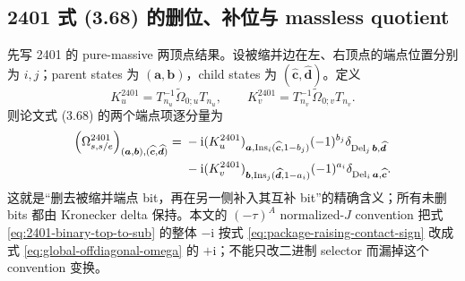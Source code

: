\documentclass[11pt,a4paper]{ctexart}
\newcommand{\ii}{\mathrm i}
\begin{document}
\subsection{2401 式 (3.68) 的删位、补位与 massless quotient}

先写 2401 的 pure-massive 两顶点结果。设被缩并边在左、右顶点的端点位置分别为 $i,j$；parent states 为 $(\bm a,\bm b)$，child states 为 $(\widehat{\bm c},\widehat{\bm d})$。定义
\begin{equation}
 K_u^{2401}=T_{n_u}^{-1}\widetilde\Omega_{0;u}T_{n_u},
 \qquad
 K_v^{2401}=T_{n_v}^{-1}\widetilde\Omega_{0;v}T_{n_v}.
 \label{eq:component-log-kernel}
\end{equation}
则论文式 (3.68) 的两个端点项逐分量为
\begin{align}
 \left(\Omega_{s,s/e}^{2401}\right)_{(\bm a,\bm b),(\widehat{\bm c},\widehat{\bm d})}
={}&-\ii
 (K_u^{2401})_{\bm a,\operatorname{Ins}_i(\widehat{\bm c},1-b_j)}
 (-1)^{b_j}
 \delta_{\operatorname{Del}_j\bm b,\widehat{\bm d}}
 \notag\\
 &-\ii
 (K_v^{2401})_{\bm b,\operatorname{Ins}_j(\widehat{\bm d},1-a_i)}
 (-1)^{a_i}
 \delta_{\operatorname{Del}_i\bm a,\widehat{\bm c}}.
 \label{eq:2401-binary-top-to-sub}
\end{align}
这就是“删去被缩并端点 bit，再在另一侧补入其互补 bit”的精确含义；所有未删 bits 都由 Kronecker delta 保持。本文的 $(-\tau)^A$ normalized-$J$ convention 把式 \eqref{eq:2401-binary-top-to-sub} 的整体 $-\ii$ 按式 \eqref{eq:package-raising-contact-sign} 改成式 \eqref{eq:global-offdiagonal-omega} 的 $+\ii$；不能只改二进制 selector 而漏掉这个 convention 变换。
\end{document}
